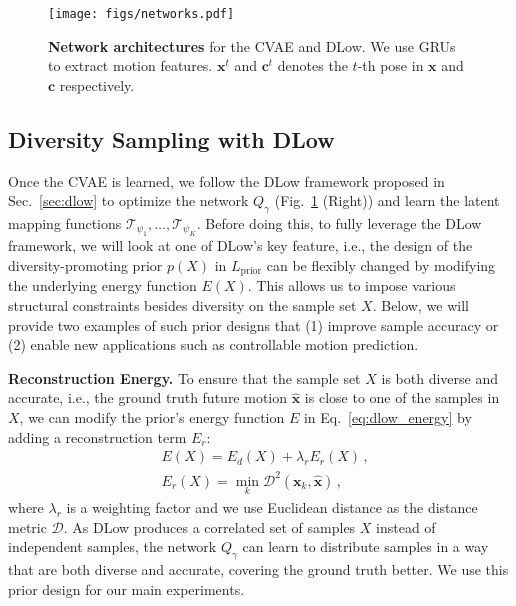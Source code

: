 \documentclass[runningheads]{llncs}
\begin{document}
	\begin{figure}[t]
		\centering
		\texttt{[image: figs/networks.pdf]}
		\vspace{-7mm}
		\caption{\textbf{Network architectures} for the CVAE and DLow. We use GRUs~\cite{chung2014empirical} to extract motion features. $\mathbf{x}^t$ and $\mathbf{c}^t$ denotes the $t$-th pose in $\mathbf{x}$ and $\mathbf{c}$ respectively.}
		\label{fig:network}
		\vspace{-5mm}
	\end{figure}
	
	\subsection{Diversity Sampling with DLow}
	Once the CVAE is learned, we follow the DLow framework proposed in Sec.~\ref{sec:dlow} to optimize the network $Q_\gamma$ (Fig.~\ref{fig:network} (Right)) and learn the latent mapping functions $\mathcal{T}_{\psi_1}, \ldots, \mathcal{T}_{\psi_K}$. Before doing this, to fully leverage the DLow framework, we will look at one of DLow's key feature, i.e., the design of the diversity-promoting prior $p(X)$ in $L_\text{prior}$ can be flexibly changed by modifying the underlying energy function $E(X)$. This allows us to impose various structural constraints besides diversity on the sample set $X$. Below, we will provide two examples of such prior designs that (1) improve sample accuracy or (2) enable new applications such as controllable motion prediction.
	
	\vspace{1mm}
	\noindent\textbf{Reconstruction Energy.}
	To ensure that the sample set $X$ is both diverse and accurate, i.e., the ground truth future motion $\hat{\mathbf{x}}$ is close to one of the samples in $X$, we can modify the prior's energy function $E$ in Eq.~\eqref{eq:dlow_energy} by adding a reconstruction term $E_r$:
	\begin{align}
	\label{eq:human_prior}
	&E(X) = E_d(X) + \lambda_r E_r(X)\,,\\
	\label{eq:e_recon}
	&E_r(X) = \min_k \mathcal{D}^2(\mathbf{x}_k, \hat{\mathbf{x}})\,,
	\end{align}
	where $\lambda_r$ is a weighting factor and we use Euclidean distance as the distance metric $\mathcal{D}$. As DLow produces a correlated set of samples $X$ instead of independent samples, the network $Q_\gamma$ can learn to distribute samples in a way that are both diverse and accurate, covering the ground truth better. We use this prior design for our main experiments.
	
\end{document}
